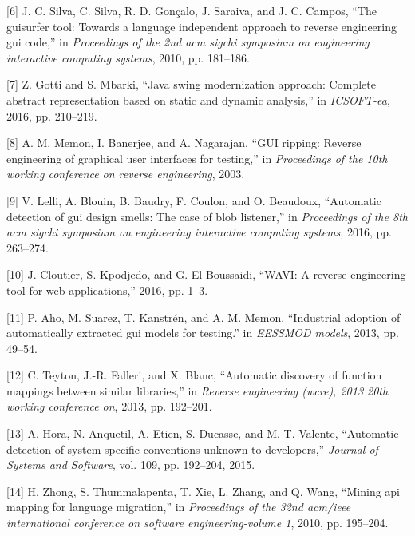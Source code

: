 \documentclass[11pt,]{article}
\begin{document}
\leavevmode\hypertarget{ref-silva2010guisurfer}{}%
{[}6{]} J. C. Silva, C. Silva, R. D. Gonçalo, J. Saraiva, and J. C.
Campos, ``The guisurfer tool: Towards a language independent approach to
reverse engineering gui code,'' in \emph{Proceedings of the 2nd acm
sigchi symposium on engineering interactive computing systems}, 2010,
pp. 181--186.

\leavevmode\hypertarget{ref-gotti2016java}{}%
{[}7{]} Z. Gotti and S. Mbarki, ``Java swing modernization approach:
Complete abstract representation based on static and dynamic analysis,''
in \emph{ICSOFT-ea}, 2016, pp. 210--219.

\leavevmode\hypertarget{ref-MemonWCRE2003}{}%
{[}8{]} A. M. Memon, I. Banerjee, and A. Nagarajan, ``GUI ripping:
Reverse engineering of graphical user interfaces for testing,'' in
\emph{Proceedings of the 10th working conference on reverse
engineering}, 2003.

\leavevmode\hypertarget{ref-lelli2016automatic}{}%
{[}9{]} V. Lelli, A. Blouin, B. Baudry, F. Coulon, and O. Beaudoux,
``Automatic detection of gui design smells: The case of blob listener,''
in \emph{Proceedings of the 8th acm sigchi symposium on engineering
interactive computing systems}, 2016, pp. 263--274.

\leavevmode\hypertarget{ref-cloutier2016wavi}{}%
{[}10{]} J. Cloutier, S. Kpodjedo, and G. El Boussaidi, ``WAVI: A
reverse engineering tool for web applications,'' 2016, pp. 1--3.

\leavevmode\hypertarget{ref-aho2013industrial}{}%
{[}11{]} P. Aho, M. Suarez, T. Kanstrén, and A. M. Memon, ``Industrial
adoption of automatically extracted gui models for testing.'' in
\emph{EESSMOD models}, 2013, pp. 49--54.

\leavevmode\hypertarget{ref-teyton2013automatic}{}%
{[}12{]} C. Teyton, J.-R. Falleri, and X. Blanc, ``Automatic discovery
of function mappings between similar libraries,'' in \emph{Reverse
engineering (wcre), 2013 20th working conference on}, 2013, pp.
192--201.

\leavevmode\hypertarget{ref-hora2015automatic}{}%
{[}13{]} A. Hora, N. Anquetil, A. Etien, S. Ducasse, and M. T. Valente,
``Automatic detection of system-specific conventions unknown to
developers,'' \emph{Journal of Systems and Software}, vol. 109, pp.
192--204, 2015.

\leavevmode\hypertarget{ref-zhong2010mining}{}%
{[}14{]} H. Zhong, S. Thummalapenta, T. Xie, L. Zhang, and Q. Wang,
``Mining api mapping for language migration,'' in \emph{Proceedings of
the 32nd acm/ieee international conference on software
engineering-volume 1}, 2010, pp. 195--204.
\end{document}
